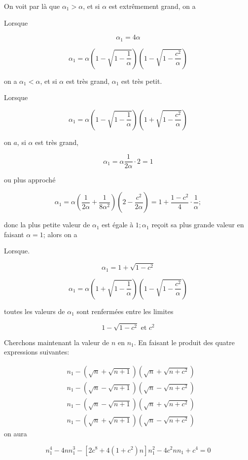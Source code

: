 \documentclass{article}
\begin{document}
On voit par là que \(\alpha_{1}>\alpha\), et si \(\alpha\) est extrêmement grand, on a

Lorsque

\[
\alpha_{1}=4 \alpha
\]

\[
\alpha_{1}=\alpha\left(1-\sqrt{1-\frac{1}{\alpha}}\right)\left(1-\sqrt{1-\frac{c^{2}}{\alpha}}\right)
\]

on a \(\alpha_{1}<\alpha\), et si \(\alpha\) est très grand, \(\alpha_{1}\) est très petit.

Lorsque

\[
\alpha_{1}=\alpha\left(1-\sqrt{1-\frac{1}{\alpha}}\right)\left(1+\sqrt{1-\frac{c^{2}}{\alpha}}\right)
\]

on \(a\), si \(\alpha\) est très grand,

\[
\alpha_{1}=\alpha \frac{1}{2 \alpha} \cdot 2=1
\]

ou plus approché

\[
\alpha_{1}=\alpha\left(\frac{1}{2 \alpha}+\frac{1}{8 \alpha^{2}}\right)\left(2-\frac{c^{2}}{2 \alpha}\right)=1+\frac{1-c^{2}}{4} \cdot \frac{1}{\alpha} ;
\]

donc la plus petite valeur de \(\alpha_{1}\) est égale à \(1 ; \alpha_{1}\) reçoit sa plus grande valeur en faisant \(\alpha=1\); alors on a

Lorsque.

\[
\alpha_{1}=1+\sqrt{1-c^{2}}
\]

\[
\alpha_{1}=\alpha\left(1+\sqrt{1-\frac{1}{\alpha}}\right)\left(1-\sqrt{1-\frac{c^{2}}{\alpha}}\right)
\]

toutes les valeurs de \(\alpha_{1}\) sont renfermées entre les limites

\[
1-\sqrt{1-c^{2}} \text { et } c^{2}
\]

Cherchons maintenant la valeur de \(n\) en \(n_{1}\). En faisant le produit des quatre expressions suivantes:

\[
\begin{aligned}
& n_{1}-(\sqrt{n}+\sqrt{n+1})\left(\sqrt{n}+\sqrt{n+c^{2}}\right) \\
& n_{1}-(\sqrt{n}-\sqrt{n+1})\left(\sqrt{n}-\sqrt{n+c^{2}}\right) \\
& n_{1}-(\sqrt{n}-\sqrt{n+1})\left(\sqrt{n}+\sqrt{n+c^{2}}\right) \\
& n_{1}-(\sqrt{n}+\sqrt{n+1})\left(\sqrt{n}-\sqrt{n+c^{2}}\right)
\end{aligned}
\]
on aura

\[
n_{1}^{4}-4 n n_{1}^{3}-\left[2 c^{8}+4\left(1+c^{2}\right) n\right] n_{1}^{2}-4 c^{2} n n_{1}+c^{4}=0
\]
\end{document}
